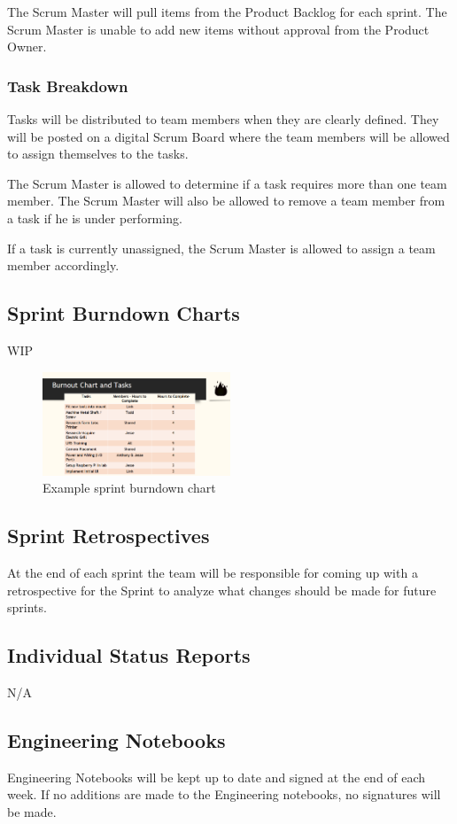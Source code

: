 The Scrum Master will pull items from the Product Backlog for each sprint. The Scrum Master is unable to add new items without approval from the Product Owner.

\subsubsection{Task Breakdown}
Tasks will be distributed to team members when they are clearly defined. They will be posted on a digital Scrum Board where the team members will be allowed to assign themselves to the tasks. 

The Scrum Master is allowed to determine if a task requires more than one team member. The Scrum Master will also be allowed to remove a team member from a task if he is under performing.

If a task is currently unassigned, the Scrum Master is allowed to assign a team member accordingly.

\subsection{Sprint Burndown Charts}
WIP

\begin{figure}[h!]
    \centering
    \includegraphics[width=0.5\textwidth]{images/Burndown_Chart}
    \caption{Example sprint burndown chart}
\end{figure}

\subsection{Sprint Retrospectives}
At the end of each sprint the team will be responsible for coming up with a retrospective for the Sprint to analyze what changes should be made for future sprints.

\subsection{Individual Status Reports}
N/A

\subsection{Engineering Notebooks}
Engineering Notebooks will be kept up to date and signed at the end of each week. If no additions are made to the Engineering notebooks, no signatures will be made.

